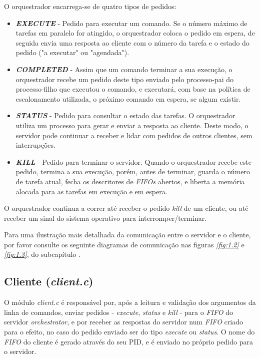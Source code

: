 \documentclass[a4paper,11pt]{scrreprt}
\begin{document}
            O orquestrador encarrega-se de quatro tipos de pedidos:
            \begin{itemize}
                \item \textit{\textbf{EXECUTE}} - Pedido para executar um comando.
                    Se o número máximo de tarefas em paralelo for atingido,
                    o orquestrador coloca o pedido em espera,
                    de seguida envia uma resposta ao cliente com o número da tarefa
                    e o estado do pedido ("a executar" ou "agendada").

                \item \textit{\textbf{COMPLETED}} - Assim que um comando terminar a sua execução,
                    o orquestrador recebe um pedido deste tipo enviado pelo processo-pai do processo-filho
                    que executou o comando, e executará, com base na política de escalonamento utilizada,
                    o próximo comando em espera, se algum existir.

                \item \textit{\textbf{STATUS}} - Pedido para consultar o estado das tarefas.
                    O orquestrador utiliza um processo para gerar e enviar a resposta ao cliente.
                    Deste modo, o servidor pode continuar a receber e lidar com pedidos de outros
                    clientes, sem interrupções.

                \item \textit{\textbf{KILL}} - Pedido para terminar o servidor.
                    Quando o orquestrador recebe este pedido,
                    termina a sua execução, porém, antes de terminar,
                    guarda o número de tarefa atual,
                    fecha os descritores de \textit{FIFOs} abertos,
                    e liberta a memória alocada para as tarefas em execução e em espera.
            \end{itemize}
            O orquestrador continua a correr até receber o pedido \textit{kill} de um cliente,
            ou até receber um sinal do sistema operativo para interromper/terminar.

            Para uma ilustração mais detalhada da comunicação entre o servidor e o cliente,
            por favor consulte os seguinte diagramas de comunicação nas figuras
            \textit{\ref{fig:1.2}} e \textit{\ref{fig:1.3}}, do subcapítulo \textit{}.

        \subsection{Cliente (\textit{client.c})}
            O módulo \textit{client.c} é responsável por, após a leitura e validação dos argumentos da linha de comandos,
            enviar pedidos - \textit{execute}, \textit{status} e \textit{kill} - para o \textit{FIFO} do
            servidor \textit{orchestrator}, e por receber as respostas do servidor num \textit{FIFO} criado para o efeito,
            no caso do pedido enviado ser do tipo \textit{execute} ou \textit{status}. O nome do \textit{FIFO} do cliente
            é gerado através do seu PID, e é enviado no próprio pedido para o servidor.
\end{document}
